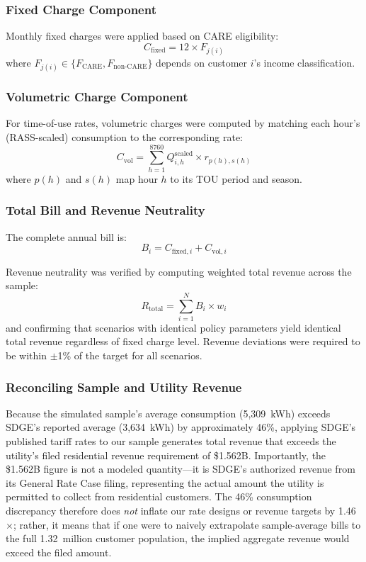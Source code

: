 \documentclass[12pt]{article}
\begin{document}
\subsubsection{Fixed Charge Component}
Monthly fixed charges were applied based on CARE eligibility:
\begin{equation}
C_{\text{fixed}} = 12 \times F_{j(i)}
\end{equation}
where $F_{j(i)} \in \{F_{\text{CARE}}, F_{\text{non-CARE}}\}$ depends on customer $i$'s income classification.

\subsubsection{Volumetric Charge Component}
For time-of-use rates, volumetric charges were computed by matching each hour's (RASS-scaled) consumption to the corresponding rate:
\begin{equation}
C_{\text{vol}} = \sum_{h=1}^{8760} Q_{i,h}^{\text{scaled}} \times r_{p(h),s(h)}
\end{equation}
where $p(h)$ and $s(h)$ map hour $h$ to its TOU period and season.

\subsubsection{Total Bill and Revenue Neutrality}
The complete annual bill is:
\begin{equation}
B_{i} = C_{\text{fixed},i} + C_{\text{vol},i}
\end{equation}

Revenue neutrality was verified by computing weighted total revenue across the sample:
\begin{equation}
R_{\text{total}} = \sum_{i=1}^{N} B_{i} \times w_i
\end{equation}
and confirming that scenarios with identical policy parameters yield identical total revenue regardless of fixed charge level. Revenue deviations were required to be within $\pm$1\% of the target for all scenarios.

\subsubsection{Reconciling Sample and Utility Revenue}
\label{sec:revenue_reconciliation}

Because the simulated sample's average consumption (5,309~kWh) exceeds SDGE's reported average (3,634~kWh) by approximately 46\%, applying SDGE's published tariff rates to our sample generates total revenue that exceeds the utility's filed residential revenue requirement of \$1.562B. Importantly, the \$1.562B figure is not a modeled quantity---it is SDGE's authorized revenue from its General Rate Case filing, representing the actual amount the utility is permitted to collect from residential customers. The 46\% consumption discrepancy therefore does \textit{not} inflate our rate designs or revenue targets by 1.46$\times$; rather, it means that if one were to naively extrapolate sample-average bills to the full 1.32~million customer population, the implied aggregate revenue would exceed the filed amount.
\end{document}
